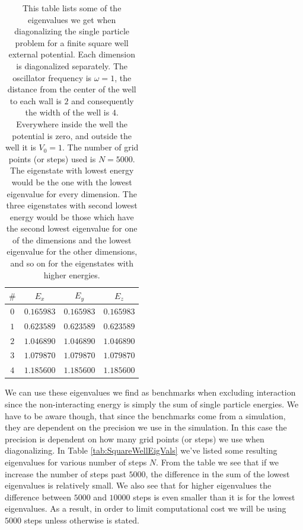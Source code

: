 \documentclass[../main.tex]{subfiles}
\begin{document}
\begin{table}[!ht]
  \centering
  \begin{tabular}{ | c | c | c | c | }
    \hline
    $\#$ & $E_x$ & $E_y$ & $E_z$\\*
    \hline
    $0$ & $0.165983$ & $0.165983$ & $0.165983$\\*
    \hline
    $1$ & $0.623589$ & $0.623589$ & $0.623589$\\*
    \hline
    $2$ & $1.046890$ & $1.046890$ & $1.046890$\\*
    \hline
    $3$ & $1.079870$ & $1.079870$ & $1.079870$\\*
    \hline
    $4$ & $1.185600$ & $1.185600$ & $1.185600$\\*
    \hline
  \end{tabular}
  \caption{This table lists some of the eigenvalues we get when diagonalizing the single particle problem for a finite square well external potential. Each dimension is diagonalized separately. The oscillator frequency is $\omega = 1$, the distance from the center of the well to each wall is $2$ and consequently the width of the well is $4$. Everywhere inside the well the potential is zero, and outside the well it is $V_0 = 1$. The number of grid points (or steps) used is $N=5000$. The eigenstate with lowest energy would be the one with the lowest eigenvalue for every dimension. The three eigenstates with second lowest energy would be those which have the second lowest eigenvalue for one of the dimensions and the lowest eigenvalue for the other dimensions, and so on for the eigenstates with higher energies.}
  \label{tab:SquareWellEigenvalues}
\end{table}

We can use these eigenvalues we find as benchmarks when excluding interaction since the non-interacting energy is simply the sum of single particle energies. We have to be aware though, that since the benchmarks come from a simulation, they are dependent on the precision we use in the simulation. In this case the precision is dependent on how many grid points (or steps) we use when diagonalizing. In Table \ref{tab:SquareWellEigVals} we've listed some resulting eigenvalues for various number of steps $N$. From the table we see that if we increase the number of steps past $5000$, the difference in the sum of the lowest eigenvalues is relatively small. We also see that for higher eigenvalues the difference between $5000$ and $10000$ steps is even smaller than it is for the lowest eigenvalues. As a result, in order to limit computational cost we will be using $5000$ steps unless otherwise is stated.
\end{document}
